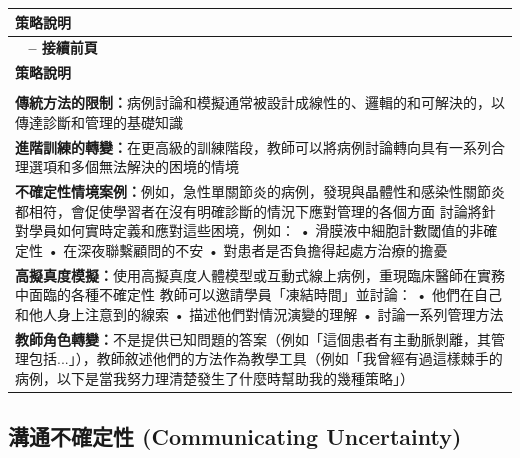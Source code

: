 \documentclass[12pt,a4paper]{article}
\begin{document}
\begin{longtable}{>{\raggedright\arraybackslash}p{15cm}}
\toprule
\textbf{\textcolor{emergency_red}{策略說明}} \\
\midrule
\endfirsthead

\multicolumn{1}{c}%
{{\bfseries \tablename\ \thetable{} -- 接續前頁}} \\
\toprule
\textbf{\textcolor{emergency_red}{策略說明}} \\
\midrule
\endhead

\midrule \multicolumn{1}{r}{{接續下頁}} \\ \midrule
\endfoot

\bottomrule
\endlastfoot

\textbf{傳統方法的限制：}病例討論和模擬通常被設計成線性的、邏輯的和可解決的，以傳達診斷和管理的基礎知識 \\

\textbf{進階訓練的轉變：}在更高級的訓練階段，教師可以將病例討論轉向具有一系列合理選項和多個無法解決的困境的情境 \\

\textbf{不確定性情境案例：}例如，急性單關節炎的病例，發現與晶體性和感染性關節炎都相符，會促使學習者在沒有明確診斷的情況下應對管理的各個方面 \newline 討論將針對學員如何實時定義和應對這些困境，例如： \newline • 滑膜液中細胞計數閾值的非確定性 \newline • 在深夜聯繫顧問的不安 \newline • 對患者是否負擔得起處方治療的擔憂 \\

\textbf{高擬真度模擬：}使用高擬真度人體模型或互動式線上病例，重現臨床醫師在實務中面臨的各種不確定性 \newline 教師可以邀請學員「凍結時間」並討論： \newline • 他們在自己和他人身上注意到的線索 \newline • 描述他們對情況演變的理解 \newline • 討論一系列管理方法 \\

\textbf{教師角色轉變：}不是提供已知問題的答案（例如「這個患者有主動脈剝離，其管理包括...」），教師敘述他們的方法作為教學工具（例如「我曾經有過這樣棘手的病例，以下是當我努力理清楚發生了什麼時幫助我的幾種策略」） \\
\end{longtable}

\subsection{溝通不確定性 (Communicating Uncertainty)}
\end{document}
